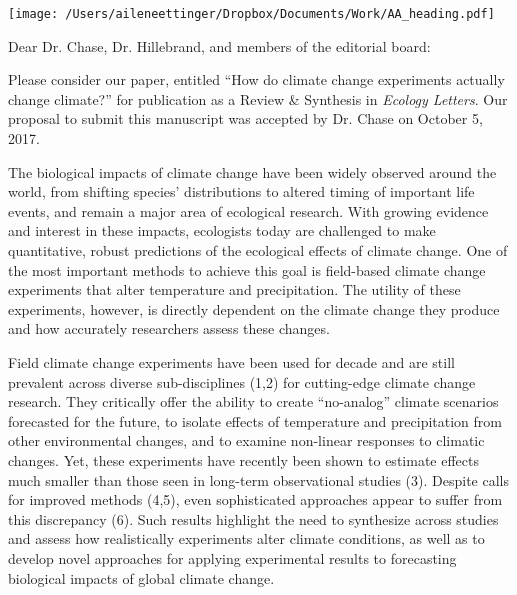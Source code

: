 \documentclass[11pt,a4paper]{letter}
\begin{document}


\begin{letter}{}
\texttt{[image: /Users/aileneettinger/Dropbox/Documents/Work/AA\_heading.pdf]}

\opening{Dear Dr. Chase, Dr. Hillebrand, and members of the editorial board:}
Please consider our paper, entitled ``How do climate change experiments actually change climate?'' for publication as a Review \& Synthesis in \emph{Ecology Letters}. Our proposal to submit this manuscript was accepted by Dr. Chase on October 5, 2017. 

The biological impacts of climate change have been widely observed around the world, from shifting species' distributions to altered timing of important life events, and remain a major area of ecological research. With growing evidence and interest in these impacts, ecologists today are challenged to make quantitative, robust predictions of the ecological effects of climate change. One of the most important methods to achieve this goal is field-based climate change experiments that alter temperature and precipitation. The utility of these experiments, however, is directly dependent on the climate change they produce and how accurately researchers assess these changes. 

Field climate change experiments have been used for decade and are still prevalent across diverse sub-disciplines  (1,2) %
for cutting-edge climate change research. They critically offer the ability to create ``no-analog'' climate scenarios forecasted for the future, to isolate effects of temperature and precipitation from other environmental changes, and to examine non-linear responses to climatic changes. Yet, these experiments have recently been shown to estimate effects much smaller than those seen in long-term observational studies (3). %
Despite calls for improved methods (4,5), %
even sophisticated approaches appear to suffer from this discrepancy (6). %
Such results highlight the need to synthesize across studies and assess how realistically experiments alter climate conditions, as well as to develop novel approaches for applying experimental results to forecasting biological impacts of global climate change. 


\end{letter}
\end{document}
